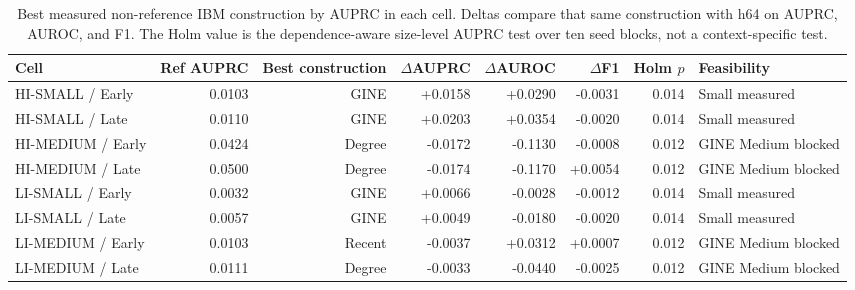 \begin{table}[t]
\caption{Best measured non-reference IBM construction by AUPRC in each cell. Deltas compare that same construction with h64 on AUPRC, AUROC, and F1. The Holm value is the dependence-aware size-level AUPRC test over ten seed blocks, not a context-specific test.}
\label{tab:ibm-construction}
\centering
\footnotesize
\setlength{\tabcolsep}{3.0pt}
\begin{tabularx}{\textwidth}{@{}lrrrrrrX@{}}
\toprule
Cell & Ref AUPRC & Best construction & $\Delta$AUPRC & $\Delta$AUROC & $\Delta$F1 & Holm $p$ & Feasibility \\
\midrule
HI-SMALL / Early & 0.0103 & GINE & +0.0158 & +0.0290 & -0.0031 & 0.014 & Small measured \\
HI-SMALL / Late & 0.0110 & GINE & +0.0203 & +0.0354 & -0.0020 & 0.014 & Small measured \\
HI-MEDIUM / Early & 0.0424 & Degree & -0.0172 & -0.1130 & -0.0008 & 0.012 & GINE Medium blocked \\
HI-MEDIUM / Late & 0.0500 & Degree & -0.0174 & -0.1170 & +0.0054 & 0.012 & GINE Medium blocked \\
LI-SMALL / Early & 0.0032 & GINE & +0.0066 & -0.0028 & -0.0012 & 0.014 & Small measured \\
LI-SMALL / Late & 0.0057 & GINE & +0.0049 & -0.0180 & -0.0020 & 0.014 & Small measured \\
LI-MEDIUM / Early & 0.0103 & Recent & -0.0037 & +0.0312 & +0.0007 & 0.012 & GINE Medium blocked \\
LI-MEDIUM / Late & 0.0111 & Degree & -0.0033 & -0.0440 & -0.0025 & 0.012 & GINE Medium blocked \\
\bottomrule
\end{tabularx}
\end{table}
